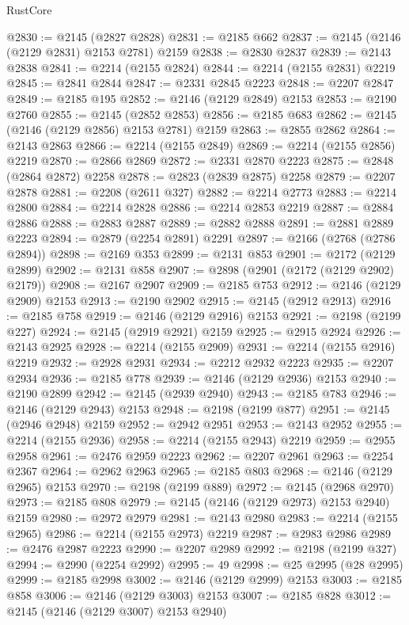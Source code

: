 \begin{lexlean}{RustCore}
\begin{coremodule}
@2830 := @2145 (@2827 @2828)
@2831 := @2185 @662
@2837 := @2145 (@2146 (@2129 @2831) @2153 @2781) @2159
@2838 := @2830 @2837
@2839 := @2143 @2838
@2841 := @2214 (@2155 @2824)
@2844 := @2214 (@2155 @2831) @2219
@2845 := @2841 @2844
@2847 := @2331 @2845 @2223
@2848 := @2207 @2847
@2849 := @2185 @195
@2852 := @2146 (@2129 @2849) @2153
@2853 := @2190 @2760
@2855 := @2145 (@2852 @2853)
@2856 := @2185 @683
@2862 := @2145 (@2146 (@2129 @2856) @2153 @2781) @2159
@2863 := @2855 @2862
@2864 := @2143 @2863
@2866 := @2214 (@2155 @2849)
@2869 := @2214 (@2155 @2856) @2219
@2870 := @2866 @2869
@2872 := @2331 @2870 @2223
@2875 := @2848 (@2864 @2872) @2258
@2878 := @2823 (@2839 @2875) @2258
@2879 := @2207 @2878
@2881 := @2208 (@2611 @327)
@2882 := @2214 @2773
@2883 := @2214 @2800
@2884 := @2214 @2828
@2886 := @2214 @2853 @2219
@2887 := @2884 @2886
@2888 := @2883 @2887
@2889 := @2882 @2888
@2891 := @2881 @2889 @2223
@2894 := @2879 (@2254 @2891) @2291
@2897 := @2166 (@2768 (@2786 @2894))
@2898 := @2169 @353
@2899 := @2131 @853
@2901 := @2172 (@2129 @2899)
@2902 := @2131 @858
@2907 := @2898 (@2901 (@2172 (@2129 @2902) @2179))
@2908 := @2167 @2907
@2909 := @2185 @753
@2912 := @2146 (@2129 @2909) @2153
@2913 := @2190 @2902
@2915 := @2145 (@2912 @2913)
@2916 := @2185 @758
@2919 := @2146 (@2129 @2916) @2153
@2921 := @2198 (@2199 @227)
@2924 := @2145 (@2919 @2921) @2159
@2925 := @2915 @2924
@2926 := @2143 @2925
@2928 := @2214 (@2155 @2909)
@2931 := @2214 (@2155 @2916) @2219
@2932 := @2928 @2931
@2934 := @2212 @2932 @2223
@2935 := @2207 @2934
@2936 := @2185 @778
@2939 := @2146 (@2129 @2936) @2153
@2940 := @2190 @2899
@2942 := @2145 (@2939 @2940)
@2943 := @2185 @783
@2946 := @2146 (@2129 @2943) @2153
@2948 := @2198 (@2199 @877)
@2951 := @2145 (@2946 @2948) @2159
@2952 := @2942 @2951
@2953 := @2143 @2952
@2955 := @2214 (@2155 @2936)
@2958 := @2214 (@2155 @2943) @2219
@2959 := @2955 @2958
@2961 := @2476 @2959 @2223
@2962 := @2207 @2961
@2963 := @2254 @2367
@2964 := @2962 @2963
@2965 := @2185 @803
@2968 := @2146 (@2129 @2965) @2153
@2970 := @2198 (@2199 @889)
@2972 := @2145 (@2968 @2970)
@2973 := @2185 @808
@2979 := @2145 (@2146 (@2129 @2973) @2153 @2940) @2159
@2980 := @2972 @2979
@2981 := @2143 @2980
@2983 := @2214 (@2155 @2965)
@2986 := @2214 (@2155 @2973) @2219
@2987 := @2983 @2986
@2989 := @2476 @2987 @2223
@2990 := @2207 @2989
@2992 := @2198 (@2199 @327)
@2994 := @2990 (@2254 @2992)
@2995 := 49
@2998 := @25 @2995 (@28 @2995)
@2999 := @2185 @2998
@3002 := @2146 (@2129 @2999) @2153
@3003 := @2185 @858
@3006 := @2146 (@2129 @3003) @2153
@3007 := @2185 @828
@3012 := @2145 (@2146 (@2129 @3007) @2153 @2940)

\end{coremodule}
\end{lexlean}
